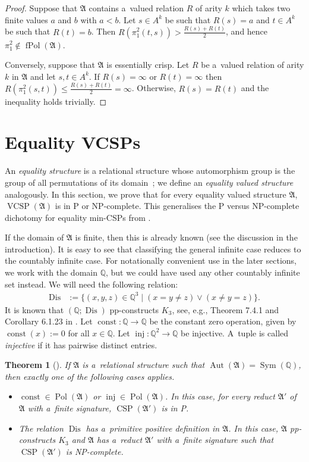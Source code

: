 \documentclass[preprint,12pt]{elsarticle}
\newcommand{\Q}{\mathbb Q}
\newcommand{\bA}{{\mathfrak A}}
\DeclareMathOperator{\Aut}{Aut}
\DeclareMathOperator{\fPol}{fPol}
\DeclareMathOperator{\VCSP}{VCSP}
\DeclareMathOperator{\CSP}{CSP}
\DeclareMathOperator{\Pol}{Pol}
\DeclareMathOperator{\Sym}{Sym}
\DeclareMathOperator{\inj}{inj}
\DeclareMathOperator{\const}{const}
\DeclareMathOperator{\Dis}{Dis}
\newtheorem{theorem}{Theorem}
\begin{document}
\begin{proof}
Suppose that $\bA$ contains a~valued relation $R$ of arity $k$ which takes two finite values $a$ and $b$ with $a<b$. 
Let $s \in A^k$ be such that $R(s) = a$ and $t \in A^k$ be such that $R(t) = b$. Then $R(\pi^2_1(t,s)) > \frac{R(s)+R(t)}{2}$, and hence $\pi^2_1 \notin   \fPol(\bA)$. 

Conversely, suppose that $\bA$ is essentially crisp. Let $R$ be a~valued relation of arity $k$ in $\bA$ and let 
$s,t \in A^k$. If $R(s) = \infty$ or $R(t) = \infty$
then $R(\pi^2_1(s,t)) \leq \frac{R(s)+R(t)}{2} = \infty$. Otherwise, $R(s) = R(t)$ and 
the inequality holds trivially. 
\end{proof} 


\section{Equality VCSPs}
\label{sect:evcsps}
An \emph{equality structure} is a relational structure whose automorphism group is the group of all permutations of its domain~\cite{ecsps}; we define an \emph{equality valued structure} analogously. In this section, we prove that 
for every equality valued structure $\bA$, 
$\VCSP(\bA)$ is in P or NP-complete. This generalises the P versus NP-complete dichotomy for equality min-CSPs from \cite{OsipovW23}.


If the domain of $\bA$ is finite, then this is already known (see the discussion in the introduction). It is easy to see that classifying the general infinite case reduces to the countably infinite case. For notationally convenient use in the later sections, we work with the domain ${\mathbb Q}$, but we could have used any other countably infinite set instead.
We will need the following relation:
\begin{align} 
\label{eq:D}
\Dis & := \{(x,y,z) \in \Q^3 \mid (x=y \neq z) \vee (x \neq y = z) \}.
\end{align}
%
It is known that $(\Q;\Dis)$ pp-constructs $K_3$, see, e.g., Theorem 7.4.1 and Corollary 6.1.23 in \cite{Book}. 
Let $\const \colon {\mathbb Q} \to {\mathbb Q}$ be the constant zero operation, given by $\const(x) := 0$ for all $x \in {\mathbb Q}$. Let $\inj \colon \Q^2 \to \Q$ be injective.
A~tuple is called \emph{injective} if it has pairwise distinct entries.


\begin{theorem}[\hspace{1sp}\cite{Book, ecsps}]\label{thm:crisp-hard} 
If $\bA$ is a~relational structure such that $\Aut(\bA) = \Sym(\mathbb Q)$, then exactly one of the following cases applies. 
\begin{itemize}
    \item $\const \in \Pol(\bA)$ or $\inj \in \Pol(\bA)$.
    In this case, for every reduct $\bA'$ of $\bA$ with a~finite signature, $\CSP(\bA')$ is in P.
    \item The relation $\Dis$
    has a~primitive positive definition in $\bA$.
    In this case, $\bA$ pp-constructs $K_3$ and $\bA$ has a~reduct $\bA'$ with a~finite signature such that $\CSP(\bA')$ is NP-complete.
    \end{itemize}
\end{theorem}
\end{document}
